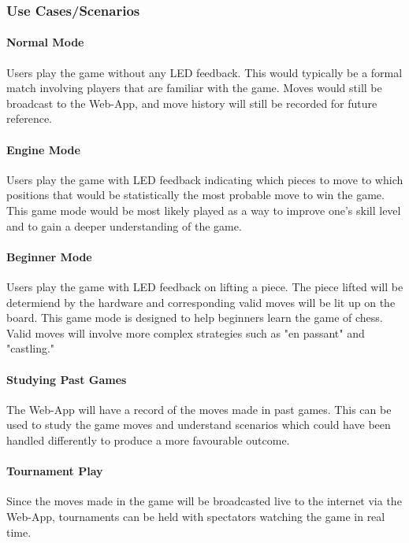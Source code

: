 \documentclass[12pt]{article}
\begin{document}
\subsubsection{Use Cases/Scenarios}{
    
    \paragraph{Normal Mode}{
        Users play the game without any LED feedback. This would typically be a formal match involving players that are familiar with the game. Moves would still be broadcast to the
        Web-App, and move history will still be recorded for future reference.
    }
        
    \paragraph{Engine Mode}{
        Users play the game with LED feedback indicating which pieces to move to which positions that would be statistically the most probable move to win the game. This game mode would
        be most likely played as a way to improve one's skill level and to gain a deeper understanding of the game.
    }
    
    \paragraph{Beginner Mode}{
        Users play the game with LED feedback on lifting a piece. The piece lifted will be determiend by the hardware and corresponding valid moves will be lit up on the board. This game
        mode is designed to help beginners learn the game of chess. Valid moves will involve more complex strategies such as "en passant" and "castling."
    }
        
    \paragraph{Studying Past Games}{
        The Web-App will have a record of the moves made in past games. This can be used to study the game moves and understand scenarios which could have been handled differently
        to produce a more favourable outcome.
    }
    
    \paragraph{Tournament Play}{
        Since the moves made in the game will be broadcasted live to the internet via the Web-App, tournaments can be held with spectators watching the game in real time.
    }
}
\end{document}
